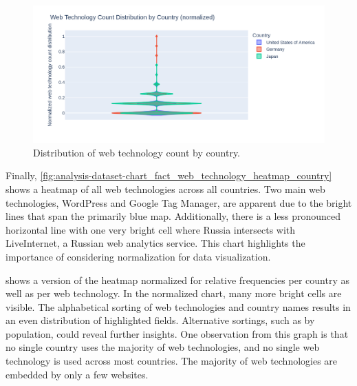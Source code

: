 \begin{figure}[H]
    \centering
    \includegraphics[width=\textwidth]{figures/charts/large/chart_fact_web_technology_violin.png}
    \caption{Distribution of web technology count by country.}
    \label{fig:analysis-dataset-chart_fact_web_technology_violin}
\end{figure}

Finally, \cref{fig:analysis-dataset-chart_fact_web_technology_heatmap_country} shows a heatmap of all web technologies across all countries.
Two main web technologies, WordPress and Google Tag Manager, are apparent due to the bright lines that span the primarily blue map.
Additionally, there is a less pronounced horizontal line with one very bright cell where Russia intersects with LiveInternet, a Russian web analytics service.
This chart highlights the importance of considering normalization for data visualization.

 shows a version of the heatmap normalized for relative frequencies per country as well as per web technology.
In the normalized chart, many more bright cells are visible.
The alphabetical sorting of web technologies and country names results in an even distribution of highlighted fields.
Alternative sortings, such as by population, could reveal further insights.
One observation from this graph is that no single country uses the majority of web technologies, and no single web technology is used across most countries.
The majority of web technologies are embedded by only a few websites.
